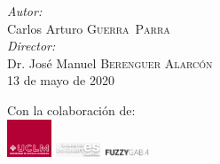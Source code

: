 \begin{titlepage}

\emph{Autor:}\\
Carlos Arturo \textsc{Guerra~Parra} %
\\[0.5cm]
\emph{Director:} \\
Dr. José Manuel \textsc{Berenguer Alarcón} %
\\[0.7cm]



{\large 13 de mayo de 2020} %


 

\vfill %

{\tiny Con la colaboración de:}\\
\includegraphics[width=0.1\textwidth]{./portada/logoUCLM}
\includegraphics[width=0.1\textwidth]{./portada/logoBellasartes}
\includegraphics[width=0.1\textwidth]{./portada/logoFuzzyGab}

\end{titlepage}